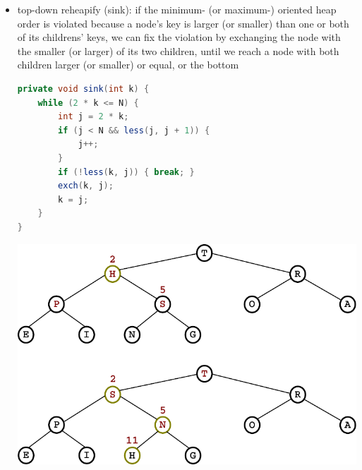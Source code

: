 \documentclass[8pt,a4paper,compress]{beamer}
\begin{document}
\begin{frame}[fragile]
\begin{itemize}
\item top-down reheapify (sink): if the minimum- (or maximum-) oriented heap order is violated because a node's key is larger (or smaller) than one or both of its childrens' keys, we can fix the violation by exchanging the node with the smaller (or larger) of its two children, until we reach a node with both children
larger (or smaller) or equal, or the bottom 

\bigskip

\begin{minipage}{150pt}
\begin{lstlisting}[language=Java]
private void sink(int k) {
    while (2 * k <= N) {
        int j = 2 * k;
        if (j < N && less(j, j + 1)) { 
            j++; 
        }
        if (!less(k, j)) { break; }
        exch(k, j);
        k = j;
    }
}
\end{lstlisting}
\end{minipage}%
\begin{minipage}{130pt}
\hfill \includegraphics[scale=0.35]{./figures/heapify_sink.pdf}
\end{minipage}
\end{itemize}
\end{frame}
\end{document}
